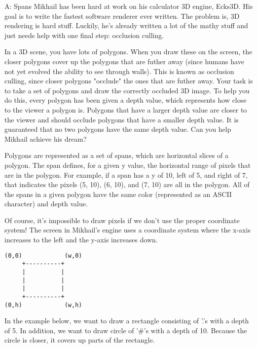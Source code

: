 \begin{problem}{A: Spans}
Mikhail has been hard at work on his calculator 3D engine, Ecks3D. His goal is to write the fastest software renderer ever written. The problem is, 3D rendering is hard stuff. Luckily, he's already written a lot of the mathy stuff and just needs help with one final step: occlusion culling.

In a 3D scene, you have lots of polygons. When you draw these on the screen, the closer polygons cover up the polygons that are futher away (since humans have not yet evolved the ability to see through walls). This is known as occlusion culling, since closer polygons "occlude" the ones that are futher away. Your task is to take a set of polygons and draw the correctly occluded 3D image. To help you do this, every polygon has been given a depth value, which represents how close to the viewer a polygon is. Polygons that have a larger depth value are closer to the viewer and should occlude polygons that have a smaller depth value. It is guaranteed that no two polygons have the same depth value. Can you help Mikhail achieve his dream?

Polygons are represented as a set of spans, which are horizontal slices of a polygon. The span defines, for a given y value, the horizontal range of pixels that are in the polygon. For example, if a span has a y of 10, left of 5, and right of 7, that indicates the pixels (5, 10), (6, 10), and (7, 10) are all in the polygon. All of the spans in a given polygon have the same color (represented as an ASCII character) and depth value.

Of course, it's impossible to draw pixels if we don't use the proper coordinate system! The screen in Mikhail's engine uses a coordinate system where the x-axis increases to the left and the y-axis increases down.

\begin{verbatim}
(0,0)            (w,0)
     +----------+
     |          |
     |          |
     |          |
     +----------+
(0,h)            (w,h)
\end{verbatim}

In the example below, we want to draw a rectangle consisting of '.'s with a depth of 5. In addition, we want to draw circle of '\#'s with a depth of 10. Because the circle is closer, it covers up parts of the rectangle.

\end{problem}

